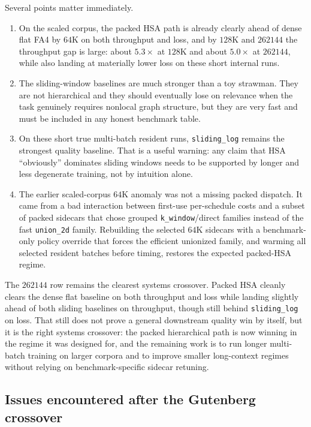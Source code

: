 \documentclass[11pt]{article}
\begin{document}
Several points matter immediately.
\begin{enumerate}[leftmargin=1.5em]
    \item On the scaled corpus, the packed HSA path is already clearly ahead of
    dense flat FA4 by $64$K on both throughput and loss, and by $128$K and
    $262144$ the throughput gap is large: about $5.3\times$ at $128$K and
    about $5.0\times$ at $262144$, while also landing at materially lower loss
    on these short internal runs.
    \item The sliding-window baselines are much stronger than a toy strawman.
    They are not hierarchical and they should eventually lose on relevance when
    the task genuinely requires nonlocal graph structure, but they are very fast
    and must be included in any honest benchmark table.
    \item On these short true multi-batch resident runs, \texttt{sliding\_log}
    remains the strongest quality baseline. That is a useful warning: any claim
    that HSA ``obviously'' dominates sliding windows needs to be supported by
    longer and less degenerate training, not by intuition alone.
    \item The earlier scaled-corpus $64$K anomaly was not a missing packed
    dispatch. It came from a bad interaction between first-use per-schedule
    costs and a subset of packed sidecars that chose grouped
    \texttt{k\_window}/direct families instead of the fast \texttt{union\_2d}
    family. Rebuilding the selected $64$K sidecars with a benchmark-only
    policy override that forces the efficient unionized family, and warming all
    selected resident batches before timing, restores the expected packed-HSA
    regime.
\end{enumerate}

The $262144$ row remains the clearest systems crossover. Packed HSA cleanly
clears the dense flat baseline on both throughput and loss while landing
slightly ahead of both sliding baselines on throughput, though still behind
\texttt{sliding\_log} on loss. That still does not prove a general downstream
quality win by itself, but it is the right systems crossover: the packed
hierarchical path is now winning in the regime it was designed for, and the
remaining work is to run longer multi-batch training on larger corpora and to
improve smaller long-context regimes without relying on benchmark-specific
sidecar retuning.

\subsection{Issues encountered after the Gutenberg crossover}
\end{document}
